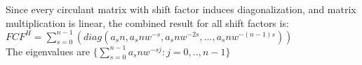 \documentclass[12pt,letter]{article}
\begin{document}
\begin{enumerate}
\begin{enumerate}
      Since every circulant matrix with shift factor induces diagonalization, and matrix multiplication is linear, the combined result for all shift factors is:\\
      
      $FCF^H = \sum_{s=0}^{n-1} (diag(a_s n, a_s n w^{-s}, a_s n w^{-2s}, ..., a_s n w^{-(n-1)s}))$\\
      The eigenvalues are $\{ \sum_{s=0}^{n-1} a_s n w^{-sj}: j=0,..,n-1\}$
      
    \end{enumerate}

    
\end{enumerate}
\end{document}
